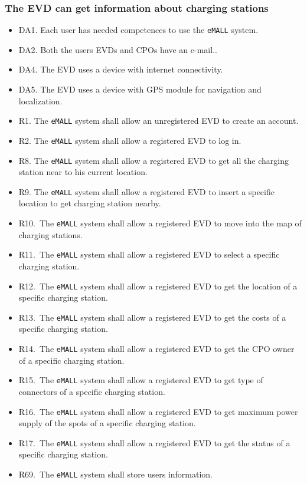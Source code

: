 \subsubsection*{The EVD can get information about charging stations}
\begin{itemize}
    \item DA1. Each user has needed competences to use the \verb|eMALL| system.
    \item DA2. Both the users EVDs and CPOs have an e-mail..
    \item DA4. The EVD uses a device with internet connectivity.
    \item DA5. The EVD uses a device with GPS module for navigation and localization.
    \item R1. The \verb|eMALL| system shall allow an unregistered EVD to create an account.
    \item R2. The \verb|eMALL| system shall allow a registered EVD to log in.
    \item R8. The \verb|eMALL| system shall allow a registered EVD to get all the charging station
    near to his current location.
    \item R9. The \verb|eMALL| system shall allow a registered EVD to insert a specific location to
    get charging station nearby.
    \item R10.\ The \verb|eMALL| system shall allow a registered EVD to move into the map of charging
    stations.
    \item R11.\ The \verb|eMALL| system shall allow a registered EVD to select a specific charging
    station.
    \item R12.\ The \verb|eMALL| system shall allow a registered EVD to get the location of a specific
    charging station.
    \item R13.\ The \verb|eMALL| system shall allow a registered EVD to get the costs of a specific
    charging station.
    \item R14.\ The \verb|eMALL| system shall allow a registered EVD to get the CPO owner of a
    specific charging station.
    \item R15.\ The \verb|eMALL| system shall allow a registered EVD to get type of connectors of a
    specific charging station.
    \item R16.\ The \verb|eMALL| system shall allow a registered EVD to get maximum power supply
    of the spots of a specific charging station.
    \item R17.\ The \verb|eMALL| system shall allow a registered EVD to get the status of a specific
    charging station.
    \item R69.\ The \verb|eMALL| system shall store users information.
\end{itemize}

